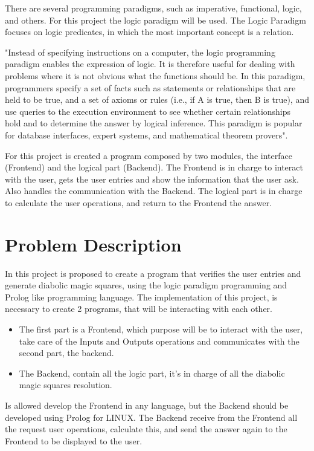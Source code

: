 \documentclass[12pt]{article}
\begin{document}
There are several programming paradigms, such as imperative, functional, logic, and others. For this project the logic paradigm will be used. The Logic Paradigm focuses on logic predicates, in which the most important concept is a relation.

"Instead of specifying instructions on a computer, the logic programming paradigm enables the expression of logic. It is therefore useful for dealing with problems where it is not obvious what the functions should be. In this paradigm, programmers specify a set of facts such as statements or relationships that are held to be true, and a set of axioms or rules (i.e., if A is true, then B is true), and use queries to the execution environment to see whether certain relationships hold and to determine the answer by logical inference. This paradigm is popular for database interfaces, expert systems, and mathematical theorem provers"\cite{hitory}.


For this project is created a program composed by two modules, the interface (Frontend) and the logical part (Backend). The Frontend is in charge to interact with the user, gets the user entries and show the information that the user ask. Also handles the communication with the Backend. The logical part is in charge to calculate the user operations, and return to the Frontend the answer.






\newpage
\section{Problem Description}
In this project is proposed to create a program that verifies the user entries and generate diabolic magic squares, using the logic paradigm programming and Prolog  like programming language.
The implementation of this project, is necessary to create 2 programs, that will be interacting with each other.
\begin{itemize}
\item The first part is a Frontend, which purpose will be to interact with the user, take care of the Inputs and Outputs operations and communicates with the second part, the backend.
\item The Backend, contain all the logic part, it's in charge of all the diabolic magic squares resolution.
\end{itemize}
Is allowed develop the Frontend in any language, but the Backend should be developed using Prolog for LINUX. The Backend receive from the Frontend all the request user operations, calculate this, and send the answer again to the Frontend to be displayed to the user.
\end{document}
